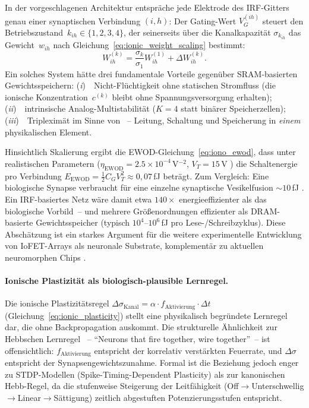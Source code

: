 \documentclass[12pt, a4paper, openany]{report}
\begin{document}
In der vorgeschlagenen Architektur entspräche jede Elektrode des
IRF-Gitters genau einer synaptischen Verbindung $(i, h)$: Der Gating-Wert
$V_G^{(ih)}$ steuert den Betriebszustand~$k_{ih} \in \{1,2,3,4\}$, der
seinerseits über die Kanalkapazität $\sigma_{k_{ih}}$ das Gewicht~$w_{ih}$
nach Gleichung~\ref{eq:ionic_weight_scaling} bestimmt:
\begin{equation}
  W^{(k)}_{ih} = \frac{\sigma_{k}}{\sigma_1} W^{(1)}_{ih} + \Delta W^{(k)}_{ih}.
  \label{eq:outlook_weight_irf}
\end{equation}
Ein solches System hätte drei fundamentale Vorteile gegenüber
SRAM-basierten Gewichtsspeichern: (\emph{i})~~Nicht-Flüchtigkeit ohne
statischen Stromfluss (die ionische Konzentration~$c^{(k)}$ bleibt ohne
Spannungsversorgung erhalten); (\emph{ii})~~intrinsische Analog-Multistabilität
($K=4$ statt binärer Speicherzellen); (\emph{iii})~~Tripleximät im Sinne von
\citeauthor{epp2026iono}~-- Leitung, Schaltung und Speicherung in \textit{einem}
physikalischen Element.

Hinsichtlich Skalierung ergibt die EWOD-Gleichung~\ref{eq:iono_ewod}, dass
unter realistischen Parametern ($\eta_{\text{EWOD}} = 2.5\times10^{-4}$\,V$^{-2}$,
$V_T = 15$\,V \cite{epp2026iono}) die Schaltenergie pro Verbindung
$E_{\text{EWOD}} = \frac{1}{2} C_G V_T^2 \approx 0{,}07$\,fJ beträgt.
Zum Vergleich: Eine biologische Synapse verbraucht für eine einzelne
synaptische Vesikelfusion $\sim\!10$\,fJ \cite{laughlin03}.  Ein IRF-basiertes
Netz wäre damit etwa $140\times$ energieeffizienter als das
biologische Vorbild~-- und mehrere Größenordnungen effizienter als
DRAM-basierte Gewichtsspeicher (typisch $10^4$--$10^6$\,fJ pro
Lese-/Schreibzyklus).  Diese Abschätzung ist ein starkes Argument für die
weitere experimentelle Ent\-wick\-lung von IoFET-Arrays als neuronale Substrate,
komplementär zu aktuellen neuromorphen Chips \cite{schuman17}.

\paragraph{Ionische Plastizität als biologisch-plausible Lernregel.}
Die ionische Plastizitätsregel
$\Delta\sigma_{\text{Kanal}} = \alpha \cdot f_{\text{Aktivierung}} \cdot \Delta t$
(Gleichung~\ref{eq:ionic_plasticity}) stellt eine physikalisch begründete
Lernregel dar, die ohne Backpropagation auskommt.  Die strukturelle Ähnlichkeit
zur Hebbschen Lernregel \cite{hebb49}~-- ``Neurons that fire together, wire
together''~-- ist offensichtlich: $f_{\text{Aktivierung}}$ entspricht der
korrelativ verstärkten Feuerrate, und $\Delta\sigma$ entspricht der
Synapsengewichts\-zunahme.  Formal ist die Beziehung jedoch enger zu
STDP-Modellen (Spike-Timing-Dependent Plasticity) als zur kanonischen
Hebb-Regel, da die stufenweise Steigerung der Leitfähigkeit (Off$\to$Unterschwellig$\to$Linear$\to$Sättigung) zeitlich
abgestuften Potenzierungsstufen entspricht.
\end{document}
